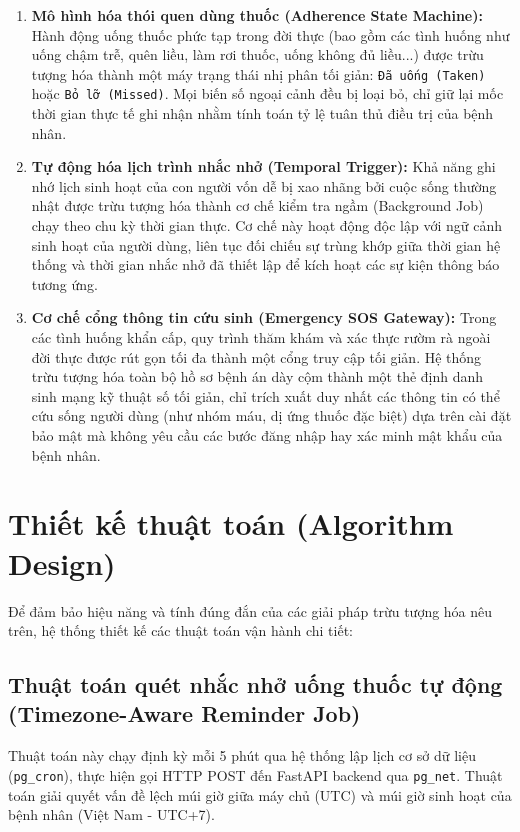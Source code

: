 \documentclass[12pt,a4paper]{report}
\begin{document}
\begin{enumerate}[leftmargin=1.5em, itemsep=4pt]
    \item \textbf{Mô hình hóa thói quen dùng thuốc (Adherence State Machine):} 
    Hành động uống thuốc phức tạp trong đời thực (bao gồm các tình huống như uống chậm trễ, quên liều, làm rơi thuốc, uống không đủ liều...) được trừu tượng hóa thành một máy trạng thái nhị phân tối giản: \texttt{Đã uống (Taken)} hoặc \texttt{Bỏ lỡ (Missed)}. Mọi biến số ngoại cảnh đều bị loại bỏ, chỉ giữ lại mốc thời gian thực tế ghi nhận nhằm tính toán tỷ lệ tuân thủ điều trị của bệnh nhân.
    
    \item \textbf{Tự động hóa lịch trình nhắc nhở (Temporal Trigger):}
    Khả năng ghi nhớ lịch sinh hoạt của con người vốn dễ bị xao nhãng bởi cuộc sống thường nhật được trừu tượng hóa thành cơ chế kiểm tra ngầm (Background Job) chạy theo chu kỳ thời gian thực. Cơ chế này hoạt động độc lập với ngữ cảnh sinh hoạt của người dùng, liên tục đối chiếu sự trùng khớp giữa thời gian hệ thống và thời gian nhắc nhở đã thiết lập để kích hoạt các sự kiện thông báo tương ứng.
    
    \item \textbf{Cơ chế cổng thông tin cứu sinh (Emergency SOS Gateway):}
    Trong các tình huống khẩn cấp, quy trình thăm khám và xác thực rườm rà ngoài đời thực được rút gọn tối đa thành một cổng truy cập tối giản. Hệ thống trừu tượng hóa toàn bộ hồ sơ bệnh án dày cộm thành một thẻ định danh sinh mạng kỹ thuật số tối giản, chỉ trích xuất duy nhất các thông tin có thể cứu sống người dùng (như nhóm máu, dị ứng thuốc đặc biệt) dựa trên cài đặt bảo mật mà không yêu cầu các bước đăng nhập hay xác minh mật khẩu của bệnh nhân.
\end{enumerate}

\section{Thiết kế thuật toán (Algorithm Design)}

Để đảm bảo hiệu năng và tính đúng đắn của các giải pháp trừu tượng hóa nêu trên, hệ thống thiết kế các thuật toán vận hành chi tiết:

\subsection{Thuật toán quét nhắc nhở uống thuốc tự động (Timezone-Aware Reminder Job)}
Thuật toán này chạy định kỳ mỗi 5 phút qua hệ thống lập lịch cơ sở dữ liệu (\texttt{pg\_cron}), thực hiện gọi HTTP POST đến FastAPI backend qua \texttt{pg\_net}. Thuật toán giải quyết vấn đề lệch múi giờ giữa máy chủ (UTC) và múi giờ sinh hoạt của bệnh nhân (Việt Nam - UTC+7).
\end{document}

